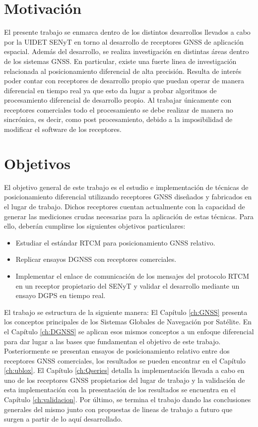 \documentclass[a4paper,12pt,oneside,onecolumn,final,openright]{book}%
\begin{document}
\section*{Motivación}
	El presente trabajo se enmarca dentro de los distintos desarrollos llevados a cabo por la UIDET SENyT en torno al desarrollo de receptores GNSS de aplicación espacial. Además del desarrollo, se realiza investigación en distintas áreas dentro de los sistemas GNSS. En particular, existe una fuerte linea de investigación relacionada al posicionamiento diferencial de alta precisión. Resulta de interés poder contar con receptores de desarrollo propio que puedan operar de manera diferencial en tiempo real ya que esto da lugar a probar algoritmos de procesamiento diferencial de desarrollo propio. Al trabajar únicamente con receptores comerciales todo el procesamiento se debe realizar de manera no sincrónica, es decir, como post procesamiento, debido a la imposibilidad de modificar el software de los receptores.
\section*{Objetivos}
	El objetivo general de este trabajo es el estudio e implementación de técnicas de posicionamiento diferencial utilizando receptores GNSS diseñados y fabricados en el lugar de trabajo. Dichos receptores cuentan actualmente con la capacidad de generar las mediciones crudas necesarias para la aplicación de estas técnicas. Para ello, deberán cumplirse los siguientes objetivos particulares:
\begin{itemize}
	\item Estudiar el estándar RTCM para posicionamiento GNSS relativo.
	\item Replicar ensayos DGNSS con receptores comerciales.
	\item Implementar el enlace de comunicación de los mensajes del protocolo RTCM en un receptor propietario del SENyT y validar el desarrollo mediante un ensayo DGPS en tiempo real.
\end{itemize}	

	El trabajo se estructura de la siguiente manera: El Capítulo \ref{ch:GNSS} presenta los conceptos principales de los Sistemas Globales de Navegación por Satélite. En el Capítulo \ref{ch:DGNSS} se aplican esos mismos conceptos a un enfoque diferencial para dar lugar a las bases que fundamentan el objetivo de este trabajo. Posteriormente se presentan ensayos de posicionamiento relativo entre dos receptores GNSS comerciales, los resultados se pueden encontrar en el Capítulo \ref{ch:ublox}. El Capítulo \ref{ch:Qseries} detalla la implementación llevada a cabo en uno de los receptores GNSS propietarios del lugar de trabajo y la validación de esta implementación con la presentación de los resultados se encuentra en el Capítulo \ref{ch:validacion}. Por último, se termina el trabajo dando las conclusiones generales del mismo junto con propuestas de lineas de trabajo a futuro que surgen a partir de lo aquí desarrollado.
\end{document}
